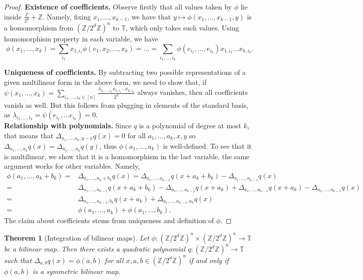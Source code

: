 \documentclass[a4paper,11pt]{article}
\newtheorem{theorem}{Theorem}
\numberwithin{theorem}{section}
\theoremstyle{definition}
\begin{document}
\begin{proof}
    \noindent\textbf{Existence of coefficients.} Observe firstly that all values taken by $\phi$ lie inside $\frac{\mathbb{Z}}{2^d} + \mathbb{Z}$. Namely, fixing $x_1, \dots, x_{k-1}$, we have that $y \mapsto \phi(x_1, \dots, x_{k-1}, y)$ is a homomorphism from $(\mathbb{Z}/2^d\mathbb{Z})^n$ to $\mathbb{T}$, which only takes such values. Using homomorphism property in each variable, we have 
    \[\phi(x_1, \dots, x_k) = \sum_{i_1}x_{1, i_1}\phi(e_1, x_2, \dots, x_k) = \dots = \sum_{i_1, \dots, i_k} \phi(e_{i_1}, \dots, e_{i_k}) x_{1, i_1} \dots x_{k, i_k}.\]
    
    \noindent\textbf{Uniqueness of coefficients.} By subtracting two possible representations of a given multilinear form in the above form, we need to show that, if $\psi(x_1, \dots, x_k) = \sum_{i_1, \dots, i_k \in [n]} \frac{\lambda_{i_1, \dots, i_k} x_{1,i_1}\cdots x_{k, i_k}}{2^d}$ always vanishes, then all coefficients vanish as well. But this follows from plugging in elements of the standard basis, as $\lambda_{i_1, \dots, i_k} = \psi(e_{i_1}, \dots e_{i_k}) = 0$.\\

    \noindent\textbf{Relationship with polynomials.} Since $q$ is a polynomial of degree at most $k$, that means that $\Delta_{a_1, \dots, a_k, y - x}q(x) = 0$ for all $a_1, \dots, a_k ,x ,y$ so $\Delta_{a_1, \dots, a_k}q(x) = \Delta_{a_1, \dots, a_k}q(y)$, thus $\phi(a_1, \dots, a_k)$ is well-defined. To see that it is multilinear, we show that it is a homomorphism in the last variable, the same argument works for other variables. Namely, 
    \begin{align*}\phi(a_1, \dots, a_k + b_k) =  &\Delta_{a_1, \dots, a_k + b_k}q(x) = \Delta_{a_1, \dots, a_{k-1}}q(x + a_k + b_k) - \Delta_{a_1, \dots, a_{k-1}}q(x) \\
    =&\Delta_{a_1, \dots, a_{k-1}}q(x + a_k + b_k) - \Delta_{a_1, \dots, a_{k-1}}q(x + a_k) + \Delta_{a_1, \dots, a_{k-1}}q(x + a_k) - \Delta_{a_1, \dots, a_{k-1}}q(x)\\
    =&\Delta_{a_1, \dots, a_{k-1}, b_k}q(x + a_k) + \Delta_{a_1, \dots, a_{k-1}, a_k}q(x)\\
    =&\phi(a_1, \dots, a_k) + \phi(a_1, \dots, b_k).
    \end{align*}
    The claim about coefficients stems from uniqueness and definition of $\phi$.
\end{proof}

\begin{theorem}[Integration of bilinear maps]\label{bilinearintegration}
    Let $\phi : (\mathbb{Z}/2^d\mathbb{Z})^n \times (\mathbb{Z}/2^d\mathbb{Z})^n \to \mathbb{T}$ be a bilinear map. Then there exists a quadratic polynomial $q : (\mathbb{Z}/2^d\mathbb{Z})^n \to \mathbb{T}$ such that $\Delta_{a,b}q(x) = \phi(a,b)$ for all $x,a,b \in (\mathbb{Z}/2^d\mathbb{Z})^n$ if and only if $\phi(a,b)$ is a symmetric bilinear map.
\end{theorem}
\end{document}
